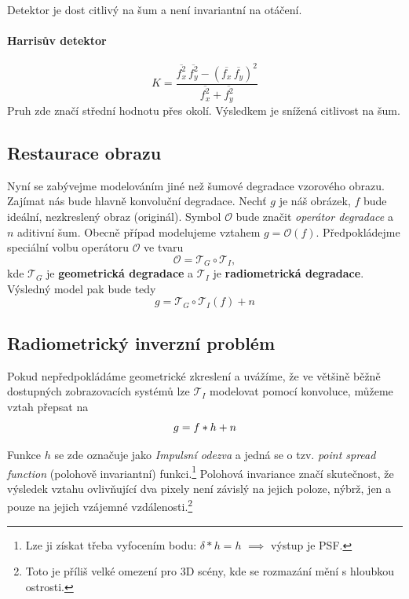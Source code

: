 \begin{itemize}
Detektor je dost citlivý na šum a není invariantní na otáčení.


\paragraph{Harrisův detektor}
\begin{equation}
K=\frac{\overline{f^2_x}\,\overline{f^2_y}-(\overline{f_x}\,\overline{f_y})^2}{\overline{f^2_x}+\overline{f^2_y}}
\end{equation}
Pruh zde značí střední hodnotu přes okolí. Výsledkem je snížená citlivost na šum.

\end{itemize}

\subsection{Restaurace obrazu}
Nyní se zabývejme modelováním jiné než šumové degradace vzorového obrazu. Zajímat nás bude hlavně konvoluční degradace. Nechť $g$ je náš obrázek, $f$ bude ideální, nezkreslený obraz (originál). Symbol $\mathcal{O}$ bude značit \emph{operátor degradace} a $n$ aditivní šum. Obecně případ modelujeme vztahem $g=\mathcal{O} (f)$. Předpokládejme speciální volbu operátoru $\mathcal{O}$ ve tvaru
\begin{equation}
\mathcal{O} = \mathcal{T}_G\circ \mathcal{T}_I,
\end{equation}
kde $\mathcal{T}_G$ je \textbf{geometrická degradace} a $\mathcal{T}_I$ je \textbf{radiometrická degradace}. Výsledný model pak bude tedy
\begin{equation}
g = \mathcal{T}_G\circ \mathcal{T}_I (f) +n
\end{equation}

\subsection{Radiometrický inverzní problém}

Pokud nepředpokládáme geometrické zkreslení a uvážíme, že ve většině běžně dostupných zobrazovacích systémů lze $\mathcal{T}_I$ modelovat pomocí konvoluce, můžeme vztah přepsat na
\begin{equation}
g = f\ast h +n \label{eqv1}
\end{equation}

Funkce $h$ se zde označuje jako \emph{Impulsní odezva} a jedná se o tzv. \emph{point spread function} (polohově invariantní) funkci.\footnote{Lze ji získat třeba vyfocením bodu: $ \delta * h = h $ $ \implies $ výstup je PSF.} Polohová invariance značí skutečnost, že výsledek vztahu ovlivňující dva pixely není závislý na jejich poloze, nýbrž, jen a pouze na jejich vzájemné vzdálenosti.\footnote{Toto je příliš velké omezení pro 3D scény, kde se rozmazání mění s hloubkou ostrosti.}

